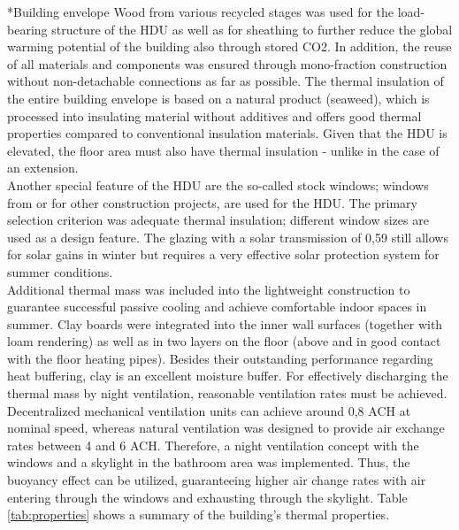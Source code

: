 \documentclass[twocolumn, a4paper,10pt]{article}
\makeatletter
\renewcommand\subsection{\@startsection{subsection}{1}{\z@}{\z@}{\z@}{\normalfont\normalsize\bfseries}}
\renewcommand\subsection{\@startsection{subsection}{1}{\z@}{\z@}{0.1pt}{\normalfont\normalsize\bfseries}}
\makeatother
\begin{document}
\subsection*{Building envelope}
Wood from various recycled stages was used for the load-bearing structure of the HDU as well as for sheathing to further reduce the global warming potential of the building also through stored CO2. In addition, the reuse of all materials and components was ensured through mono-fraction construction without non-detachable connections as far as possible. The thermal insulation of the entire building envelope is based on a natural product (seaweed), which is processed into insulating material without additives and offers good thermal properties compared  to conventional insulation materials. Given that the HDU is elevated, the floor area must also have thermal insulation - unlike in the case of an extension.\\
Another special feature of the HDU are the so-called stock windows; windows from or for other construction projects, are used for the HDU. The primary selection criterion was adequate thermal insulation; different window sizes are used as a design feature. The glazing with a solar transmission of 0,59 still allows for solar gains in winter but requires a very effective solar protection system for summer conditions.\\
Additional thermal mass was included into the lightweight construction to guarantee successful passive cooling and achieve comfortable indoor spaces in summer. Clay boards were integrated into the inner wall surfaces (together with loam rendering) as well as in two layers on the floor (above and in good contact with the floor heating pipes). Besides their outstanding performance regarding heat buffering, clay is an excellent moisture buffer. For effectively discharging the thermal mass by night ventilation, reasonable ventilation rates must be achieved. Decentralized mechanical ventilation units can achieve around 0,8 ACH at nominal speed, whereas natural ventilation was designed to provide air exchange rates between 4 and 6 ACH. Therefore, a night ventilation concept with the windows and a skylight in the bathroom area was implemented. Thus, the buoyancy effect can be utilized, guaranteeing higher air change rates with air entering through the windows and exhausting through the skylight. Table \ref{tab:properties} shows a summary of the building's thermal properties.\\
\end{document}
